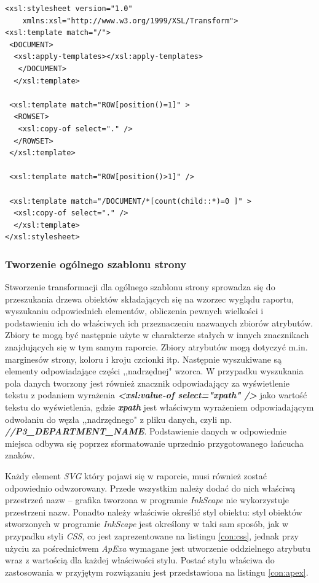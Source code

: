 \documentclass[11pt,a4paper]{article}
\begin{document}
\lstset{language=XSLT}
\begin{lstlisting}[frame=single,caption=Transformacja wstępnie przetwarzająca dane, label=solution:tool:xslt]
<xsl:stylesheet version="1.0" 
    xmlns:xsl="http://www.w3.org/1999/XSL/Transform">
<xsl:template match="/">
 <DOCUMENT>
  <xsl:apply-templates></xsl:apply-templates>
   </DOCUMENT>
  </xsl:template>

 <xsl:template match="ROW[position()=1]" >
  <ROWSET>
   <xsl:copy-of select="." />
  </ROWSET>
 </xsl:template>

 <xsl:template match="ROW[position()>1]" />

 <xsl:template match="/DOCUMENT/*[count(child::*)=0 ]" >
  <xsl:copy-of select="." />
  </xsl:template>
</xsl:stylesheet>
\end{lstlisting}


\subsubsection{Tworzenie ogólnego szablonu strony}
Stworzenie transformacji dla ogólnego szablonu strony sprowadza się do przeszukania drzewa obiektów składających się na wzorzec wyglądu raportu, wyszukaniu odpowiednich elementów, obliczenia pewnych wielkości i podstawieniu ich do właściwych ich przeznaczeniu nazwanych zbiorów atrybutów. Zbiory te mogą być następnie użyte w charakterze stałych w innych znacznikach znajdujących się w tym samym raporcie. Zbiory atrybutów mogą dotyczyć m.in. marginesów strony, koloru i kroju czcionki itp. Następnie wyszukiwane są elementy odpowiadające części ,,nadrzędnej" wzorca. W przypadku wyszukania pola danych tworzony jest również znacznik odpowiadający za wyświetlenie tekstu z podaniem wyrażenia \textbf{\emph{\textless xsl:value-of select="xpath" /\textgreater}} jako wartość tekstu do wyświetlenia, gdzie \textbf{\emph{xpath}} jest właściwym wyrażeniem odpowiadającym odwołaniu do węzła ,,nadrzędnego" z pliku danych, czyli np. \textbf{\emph{//P3\_DEPARTMENT\_NAME}}. Podstawienie danych w odpowiednie miejsca odbywa się poprzez sformatowanie uprzednio przygotowanego łańcucha znaków.

Każdy element \emph{SVG} który pojawi się w raporcie, musi również zostać odpowiednio odwzorowany. Przede wszystkim należy dodać do nich właściwą przestrzeń nazw -- grafika tworzona w programie \emph{InkScape} nie wykorzystuje przestrzeni nazw. Ponadto należy właściwie określić styl obiektu: styl obiektów stworzonych w programie \emph{InkScape} jest określony w taki sam sposób, jak w przypadku styli \emph{CSS}, co jest zaprezentowane na listingu \ref{con:css}, jednak przy użyciu za pośrednictwem \emph{ApExa} wymagane jest utworzenie oddzielnego atrybutu wraz z wartością dla każdej właściwości stylu. Postać stylu właściwa do zastosowania w przyjętym rozwiązaniu jest przedstawiona na listingu \ref{con:apex}.
\end{document}
